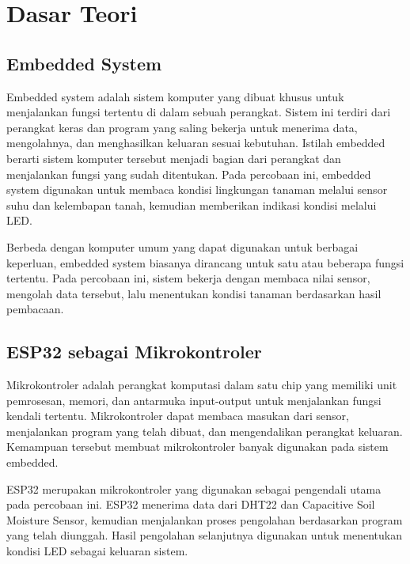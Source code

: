 \documentclass[12pt,a4paper]{article}
\begin{document}
\FloatBarrier

\section{Dasar Teori}

\subsection{Embedded System}

Embedded system adalah sistem komputer yang dibuat khusus untuk menjalankan fungsi tertentu di dalam sebuah perangkat. Sistem ini terdiri dari perangkat keras dan program yang saling bekerja untuk menerima data, mengolahnya, dan menghasilkan keluaran sesuai kebutuhan. Istilah embedded berarti sistem komputer tersebut menjadi bagian dari perangkat dan menjalankan fungsi yang sudah ditentukan. Pada percobaan ini, embedded system digunakan untuk membaca kondisi lingkungan tanaman melalui sensor suhu dan kelembapan tanah, kemudian memberikan indikasi kondisi melalui LED.

Berbeda dengan komputer umum yang dapat digunakan untuk berbagai keperluan, embedded system biasanya dirancang untuk satu atau beberapa fungsi tertentu. Pada percobaan ini, sistem bekerja dengan membaca nilai sensor, mengolah data tersebut, lalu menentukan kondisi tanaman berdasarkan hasil pembacaan.

\subsection{ESP32 sebagai Mikrokontroler}

Mikrokontroler adalah perangkat komputasi dalam satu chip yang memiliki unit pemrosesan, memori, dan antarmuka input-output untuk menjalankan fungsi kendali tertentu. Mikrokontroler dapat membaca masukan dari sensor, menjalankan program yang telah dibuat, dan mengendalikan perangkat keluaran. Kemampuan tersebut membuat mikrokontroler banyak digunakan pada sistem embedded.

ESP32 merupakan mikrokontroler yang digunakan sebagai pengendali utama pada percobaan ini. ESP32 menerima data dari DHT22 dan Capacitive Soil Moisture Sensor, kemudian menjalankan proses pengolahan berdasarkan program yang telah diunggah. Hasil pengolahan selanjutnya digunakan untuk menentukan kondisi LED sebagai keluaran sistem.
\end{document}
